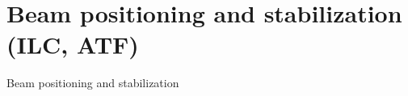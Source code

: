 \documentclass{beamer}
\begin{document}
% 
% 
% 














\section{Beam positioning and stabilization (ILC, ATF)}
\begin{frame}
 \color{blue}\Large Beam positioning and stabilization
\end{frame}
% 
\end{document}

